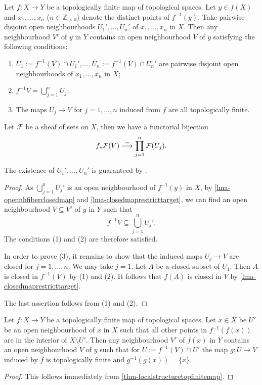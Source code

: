 \begin{thm}\label{thm-localstructuretopfinitemap}
    Let $f:X\rightarrow Y$ be a topologically finite map of topological spaces. Let $y\in f(X)$ and $x_1,\ldots,x_n$ ($n\in \mathbb{Z}_{>0}$) denote the distinct points of $f^{-1}(y)$. Take pairwise disjoint open neighbourhoods $U_1',\ldots,U_n'$ of $x_1,\ldots,x_n$ in $X$. Then any neighbourhood $V'$ of $y$ in $Y$ contains an open neighbourhood $V$ of $y$ satisfying the following conditions:
    \begin{enumerate}
        \item $U_1:=f^{-1}(V)\cap U_1',\ldots, U_n:=f^{-1}(V)\cap U_n'$ are pairwise disjoint open neighbourhoods of $x_1,\ldots,x_n$ in $X$;
        \item $f^{-1}V=\bigcup_{j=1}^n U_j$;
        \item The maps $U_j\rightarrow V$ for $j=1,\ldots,n$ induced from $f$ are all topologically finite.
    \end{enumerate}

    Let $\mathcal{F}$ be a sheaf of sets on $X$, then we have a functorial bijection
    \[
        f_*\mathcal{F}(V)\stackrel{\sim}{\longrightarrow} \prod_{j=1}^n \mathcal{F}(U_j).
    \]
\end{thm}
The existence of $U_1',\ldots,U_n'$ is guaranteed by \cite[\href{https://stacks.math.columbia.edu/tag/0CY2}{Tag 0CY2}]{stacks-project}.
\begin{proof}
    As $\bigcup_{j=1}^n U_j'$ is an open neighbourhood of $f^{-1}(y)$ in $X$, by \cref{lma-opennhfiberclosedmap} and \cref{lma-closedmaprestricttarget}, we can find an open neighbourhood $V\subseteq V'$ of $y$ in $Y$ such that 
    \[
        f^{-1}V\subseteq \bigcup_{j=1}^n U_j'.
    \]
    The conditions (1) and (2) are therefore satisfied.

    In order to prove (3), it remains to show that the induced maps $U_j\rightarrow V$ are closed for $j=1,\ldots,n$. We may take $j=1$.
    Let $A$ be a closed subset of $U_1$. Then $A$ is closed in $f^{-1}(V)$ by (1) and (2). It follows that $f(A)$ is closed in $V$ by \cref{lma-closedmaprestricttarget}.

    The last assertion follows from (1) and (2).
\end{proof}

\begin{corollary}
    Let $f:X\rightarrow Y$ be a topologically finite map of topological spaces. Let $x\in X$ be $U'$  be an open neighbourhood of $x$ in $X$ such that all other points in $f^{-1}(f(x))$ are in the interior of $X\setminus U'$. Then any neighbourhood $V'$ of $f(x)$ in $Y$ contains an open neighbourhood $V$ of $y$ such that for $U:=f^{-1}(V)\cap U'$ the map $g:U\rightarrow V$ induced by $f$ is topologically finite and $g^{-1}(g(x))=\{x\}$.
\end{corollary}
\begin{proof}
    This follows immediately from \cref{thm-localstructuretopfinitemap}.
\end{proof}

